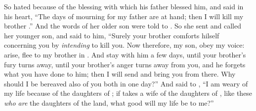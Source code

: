 \bverse So \Esau hated \Jacob because of the blessing with which his father blessed him, and \Esau said in his heart, ``The days of mourning for my father are at hand; then I will kill my brother \Jacob.''
\bverse And the words of \Esau her older son were told to \Rebekah. So she sent and called \Jacob her younger son, and said to him, ``Surely your brother \Esau comforts hilself concerning you by \textit{intending} to kill you.
\bverse Now therefore, my son, obey my voice: arise, flee to my brother \Laban in \Haran.
\bverse And stay with him a few days, until your brother's fury turns away,
\bverse until your brother's anger turns away from you, and he forgets what you have done to him; then I will send and bring you from there. Why should I be bereaved also of you both in one day?''
\bverse And \Rebekah said to \Isaac, ``I am weary of my life because of the daughters of ; if \Jacob takes a wife of the daughters of , like these \textit{who are} the daughters of the land, what good will my life be to me?''

